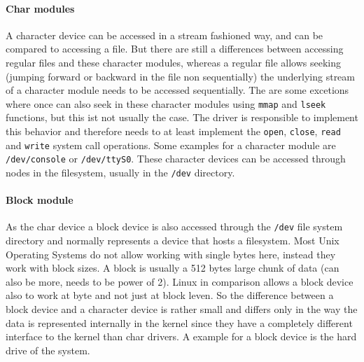 \documentclass{sig-alternate-05-2015}
\begin{document}
\paragraph{Char modules}
A character device can be accessed in a stream fashioned way, and can be compared to accessing a file. But there are still a differences between accessing regular files and these character modules, whereas a regular file allows seeking (jumping forward or backward in the file non sequentially) the underlying stream of a character module needs to be accessed sequentially. The are some excetions where once can also seek in these character modules using \texttt{mmap} and \texttt{lseek} functions, but this ist not usually the case. The driver is responsible to implement this behavior and therefore needs to at least implement the \texttt{open}, \texttt{close}, \texttt{read} and \texttt{write} system call operations. Some examples for a character module are \texttt{/dev/console} or \texttt{/dev/ttyS0}. These character devices can be accessed through nodes in the filesystem, usually in the \texttt{/dev} directory.

\paragraph{Block module}
As the char device a block device is also accessed through the \texttt{/dev} file system directory and normally represents a device that hosts a filesystem. Most Unix Operating Systems do not allow working with single bytes here, instead they work with block sizes. A block is usually a 512 bytes large chunk of data (can also be more, needs to be power of 2). Linux in comparison allows a block device also to work at byte and not just at block leven. So the difference between a block device and a character device is rather small and differs only in the way the data is represented internally in the kernel since they have a completely different interface to the kernel than char drivers. A example for a block device is the hard drive of the system.
\end{document}

